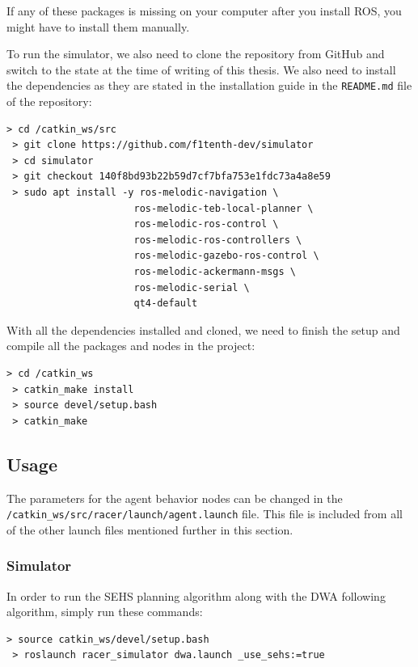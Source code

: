 If any of these packages is missing on your computer after you install ROS, you might have to install them manually.

To run the simulator, we also need to clone the repository from GitHub and switch to the state at the time of writing of this thesis. We also need to install the dependencies as they are stated in the installation guide in the \texttt{README.md} file of the repository:

\begin{Verbatim}[fontsize=\small]
 > cd /catkin_ws/src
 > git clone https://github.com/f1tenth-dev/simulator
 > cd simulator
 > git checkout 140f8bd93b22b59d7cf7bfa753e1fdc73a4a8e59
 > sudo apt install -y ros-melodic-navigation \
                      ros-melodic-teb-local-planner \
                      ros-melodic-ros-control \
                      ros-melodic-ros-controllers \
                      ros-melodic-gazebo-ros-control \
                      ros-melodic-ackermann-msgs \
                      ros-melodic-serial \
                      qt4-default
\end{Verbatim}

With all the dependencies installed and cloned, we need to finish the setup and compile all the packages and nodes in the project:

\begin{Verbatim}[fontsize=\small]
 > cd /catkin_ws
 > catkin_make install
 > source devel/setup.bash
 > catkin_make
\end{Verbatim}

\subsection{Usage}

The parameters for the agent behavior nodes can be changed in the \texttt{/catkin\_ws/\-src/\-racer/launch/\-agent.launch} file. This file is included from all of the other launch files mentioned further in this section.

\subsubsection{Simulator}

In order to run the \gls*{SEHS} planning algorithm along with the \gls*{DWA} following algorithm, simply run these commands:

\begin{Verbatim}[fontsize=\small]
 > source catkin_ws/devel/setup.bash
 > roslaunch racer_simulator dwa.launch _use_sehs:=true
\end{Verbatim}

